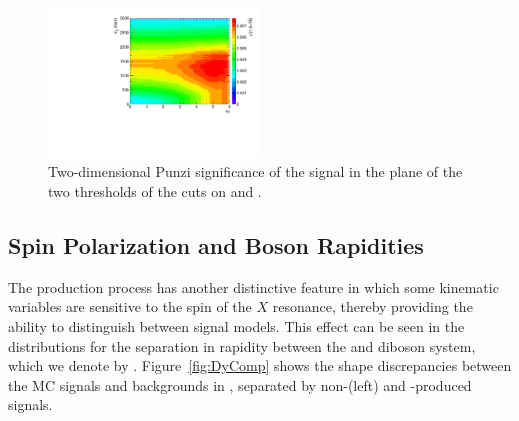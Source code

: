 \begin{figure}[htbp]
  \centering
  \includegraphics[width=0.5\textwidth]{fig/analysis/detaMjjSB.pdf}
  \caption{
    Two-dimensional Punzi significance of the \VBF\RadtoWW signal in the plane of the two thresholds of the cuts on \DetaVBF and \mjjVBF.
  }
  \label{fig:detaMjjSB_VBF}
\end{figure}

\subsection{Spin Polarization and Boson Rapidities}
\label{subsec:spinPol}

The \VBF production process has another distinctive feature in which some kinematic variables are sensitive to the spin of the $X$ resonance, thereby providing the ability to distinguish between signal models.
This effect can be seen in the distributions for the separation in rapidity between the \Vhad and \Wlep diboson system, which we denote by \Dy.
Figure~\ref{fig:DyComp} shows the shape discrepancies between the MC signals and backgrounds in \Dy, separated by non-\VBF (left) and \VBF-produced signals.

